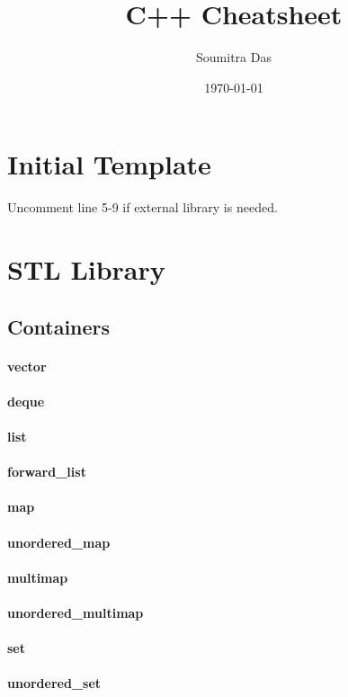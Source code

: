 \documentclass[8pt, a4paper, twocolumn]{article}
\title{C++ Cheatsheet}
\author{Soumitra Das}
\date{\today}
\begin{document}
\maketitle
\section{Initial Template}
Uncomment line 5-9 if external library is needed.

\section{STL Library}

\subsection{Containers}
\paragraph{vector}
\paragraph{deque}
\paragraph{list}
\paragraph{forward\_list}
\paragraph{map}
\paragraph{unordered\_map}
\paragraph{multimap}
\paragraph{unordered\_multimap}
\paragraph{set}
\paragraph{unordered\_set}
\end{document}
